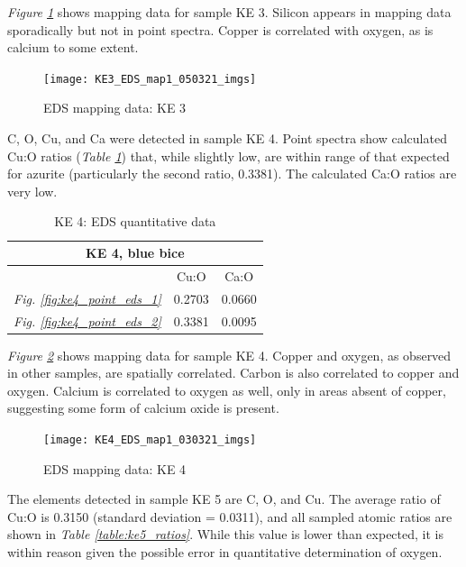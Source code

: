 \textit{Figure \ref{fig:ke3_map1}} shows mapping data for sample KE 3. Silicon appears in mapping data sporadically but not in point spectra. Copper is correlated with oxygen, as is calcium to some extent.

\begin{figure}[H]
\centering
  \texttt{[image: KE3\_EDS\_map1\_050321\_imgs]}
\caption[EDS mapping data: KE 3]{EDS mapping data: KE 3}
\label{fig:ke3_map1}
\end{figure}


C, O, Cu, and Ca were detected in sample KE 4. Point spectra show calculated Cu:O ratios (\textit{Table \ref{table:ke4_ratios}}) that, while slightly low, are within range of that expected for azurite (particularly the second ratio, 0.3381). The calculated Ca:O ratios are very low.

\begin{table}[H]
\caption{KE 4: EDS quantitative data}
\centering
\label{table:ke4_ratios}
\begin{tabular}{c c c}
\toprule
\multicolumn{3}{c}{KE 4, blue bice} \\
\midrule
~ & Cu:O & Ca:O \\
\midrule
\textit{Fig. \ref{fig:ke4_point_eds_1}} & 0.2703 & 0.0660 \\
\textit{Fig. \ref{fig:ke4_point_eds_2}} & 0.3381 & 0.0095 \\
\bottomrule
\end{tabular}
\end{table}

\textit{Figure \ref{fig:ke4_map1}} shows mapping data for sample KE 4. Copper and oxygen, as observed in other samples, are spatially correlated. Carbon is also correlated to copper and oxygen. Calcium is correlated to oxygen as well, only in areas absent of copper, suggesting some form of calcium oxide is present.

\begin{figure}[H]
\centering
  \texttt{[image: KE4\_EDS\_map1\_030321\_imgs]}
\caption[EDS mapping data: KE 4]{EDS mapping data: KE 4}
\label{fig:ke4_map1}
\end{figure}


The elements detected in sample KE 5 are C, O, and Cu. The average ratio of Cu:O is 0.3150 (standard deviation = 0.0311), and all sampled atomic ratios are shown in \textit{Table \ref{table:ke5_ratios}}. While this value is lower than expected, it is within reason given the possible error in quantitative determination of oxygen.

